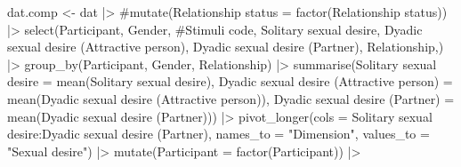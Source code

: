 \documentclass[
  bookmarksnumbered]{article}
\newenvironment{Shaded}{\begin{snugshade}}{\end{snugshade}}
\newcommand{\AttributeTok}[1]{\textcolor[rgb]{0.80,0.80,0.80}{#1}}
\newcommand{\CommentTok}[1]{\textcolor[rgb]{0.50,0.62,0.50}{#1}}
\newcommand{\FunctionTok}[1]{\textcolor[rgb]{0.94,0.94,0.56}{#1}}
\newcommand{\NormalTok}[1]{\textcolor[rgb]{0.80,0.80,0.80}{#1}}
\newcommand{\OtherTok}[1]{\textcolor[rgb]{0.94,0.94,0.56}{#1}}
\newcommand{\SpecialCharTok}[1]{\textcolor[rgb]{0.86,0.64,0.64}{#1}}
\newcommand{\StringTok}[1]{\textcolor[rgb]{0.80,0.58,0.58}{#1}}
\begin{document}
\begin{Shaded}
\begin{Highlighting}[]
\NormalTok{dat.comp }\OtherTok{\textless{}{-}}\NormalTok{ dat }\SpecialCharTok{|\textgreater{}}
  \CommentTok{\#mutate(\textasciigrave{}Relationship status\textasciigrave{} = factor(\textasciigrave{}Relationship status\textasciigrave{})) |\textgreater{} }
  \FunctionTok{select}\NormalTok{(Participant, Gender, }
         \CommentTok{\#\textasciigrave{}Stimuli code\textasciigrave{},}
         \StringTok{\textasciigrave{}}\AttributeTok{Solitary sexual desire}\StringTok{\textasciigrave{}}\NormalTok{, }
         \StringTok{\textasciigrave{}}\AttributeTok{Dyadic sexual desire (Attractive person)}\StringTok{\textasciigrave{}}\NormalTok{, }
         \StringTok{\textasciigrave{}}\AttributeTok{Dyadic sexual desire (Partner)}\StringTok{\textasciigrave{}}\NormalTok{, }
\NormalTok{         Relationship,) }\SpecialCharTok{|\textgreater{}}
  \FunctionTok{group\_by}\NormalTok{(Participant, Gender, Relationship) }\SpecialCharTok{|\textgreater{}} 
  \FunctionTok{summarise}\NormalTok{(}\StringTok{\textasciigrave{}}\AttributeTok{Solitary sexual desire}\StringTok{\textasciigrave{}} \OtherTok{=} 
              \FunctionTok{mean}\NormalTok{(}\StringTok{\textasciigrave{}}\AttributeTok{Solitary sexual desire}\StringTok{\textasciigrave{}}\NormalTok{),}
            \StringTok{\textasciigrave{}}\AttributeTok{Dyadic sexual desire (Attractive person)}\StringTok{\textasciigrave{}} \OtherTok{=} 
              \FunctionTok{mean}\NormalTok{(}\StringTok{\textasciigrave{}}\AttributeTok{Dyadic sexual desire (Attractive person)}\StringTok{\textasciigrave{}}\NormalTok{),}
            \StringTok{\textasciigrave{}}\AttributeTok{Dyadic sexual desire (Partner)}\StringTok{\textasciigrave{}} \OtherTok{=} 
              \FunctionTok{mean}\NormalTok{(}\StringTok{\textasciigrave{}}\AttributeTok{Dyadic sexual desire (Partner)}\StringTok{\textasciigrave{}}\NormalTok{)) }\SpecialCharTok{|\textgreater{}} 
  \FunctionTok{pivot\_longer}\NormalTok{(}\AttributeTok{cols =} \StringTok{\textasciigrave{}}\AttributeTok{Solitary sexual desire}\StringTok{\textasciigrave{}}\SpecialCharTok{:}\StringTok{\textasciigrave{}}\AttributeTok{Dyadic sexual desire (Partner)}\StringTok{\textasciigrave{}}\NormalTok{,}
               \AttributeTok{names\_to =} \StringTok{"Dimension"}\NormalTok{, }
               \AttributeTok{values\_to =} \StringTok{"Sexual desire"}\NormalTok{) }\SpecialCharTok{|\textgreater{}} 
  \FunctionTok{mutate}\NormalTok{(}\AttributeTok{Participant =} \FunctionTok{factor}\NormalTok{(Participant)) }\SpecialCharTok{|\textgreater{}}

\end{Highlighting}
\end{Shaded}
\end{document}
